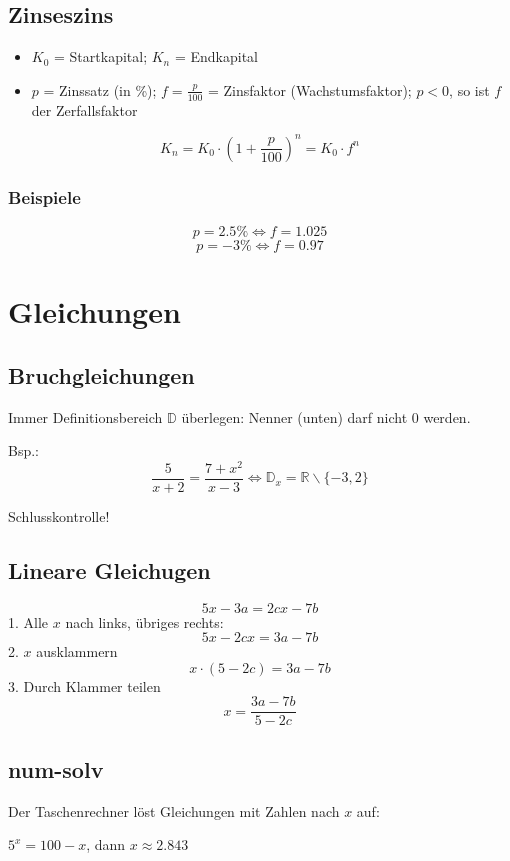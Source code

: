 \begin{multicols}{2}
\subsection{Zinseszins}
\begin{itemize}
\item $K_0$ = Startkapital; $K_n$ = Endkapital
\item $p$ = Zinssatz (in \%); $f = \frac{p}{100}$ = Zinsfaktor
(Wachstumsfaktor); $p<0$, so ist $f$ der Zerfallsfaktor
\end{itemize}
$$K_n = K_0 \cdot{} \left( 1+\frac{p}{100} \right)^n = K_0\cdot{}f^n$$

\subsubsection{Beispiele}
$$p = 2.5\% \Longleftrightarrow{} f = 1.025$$
$$p = -3\% \Longleftrightarrow{} f = 0.97$$



\section{Gleichungen}

\subsection{Bruchgleichungen}
Immer Definitionsbereich $\mathbb{D}$ überlegen: Nenner (unten) darf
nicht 0 werden.

Bsp.: $$\frac5{x+2}=\frac{7+x^2}{x-3} \Leftrightarrow{} \mathbb{D}_x=\mathbb{R}\backslash{}\{-3, 2\}$$

Schlusskontrolle!



\subsection{Lineare Gleichugen}
$$5x-3a = 2cx-7b$$
1. Alle $x$ nach links, übriges rechts:
$$5x - 2cx = 3a-7b$$
2. $x$ ausklammern
$$x\cdot{}(5-2c) = 3a-7b$$
3. Durch Klammer teilen
$$x = \frac{3a-7b}{5-2c}$$


\subsection{num-solv}
Der Taschenrechner löst Gleichungen mit Zahlen nach $x$ auf:

$5^x = 100 -x$, dann  $x\approx{}2.843$


\end{multicols}


